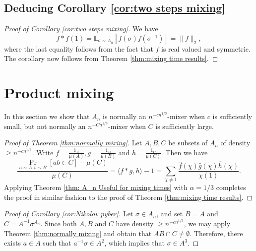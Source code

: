 \documentclass[11pt, letterpaper]{amsart}
\renewcommand\ge{\geqslant}
\begin{document}



\subsection{Deducing Corollary \ref{cor:two steps mixing}}

\begin{proof}[Proof of Corollary \ref{cor:two steps mixing}] We have \[f * f (1) =\mathbb{E}_{\sigma \sim A_n}[f(\sigma)f(\sigma^{-1})] = \|f\|_2,\]
where the last equality follows from the fact that $f$ is real valued and symmetric. The corollary now follows from Theorem \ref{thm:mixing time results}.    
\end{proof}


\section{Product mixing}
\label{sec:product mixing}
In this section we show that $A_n$ is normally an $n^{-cn^{1/3}}$-mixer when $c$ is sufficiently small, but not normally an $n^{-Cn^{1/3}}$-mixer when $C$ is sufficiently large.

\begin{proof}[Proof of Theorem \ref{thm:normally mixing}]
    Let $A,B,C$ be subsets of $A_n$ of density $\ge n^{-cn^{1/3}}$. Write $f=\frac{1_A}{\mu(A)},g=\frac{1_B}{\mu(B)}$ and $h=\frac{1_C}{\mu(C)}$. Then we have \[\frac{\Pr_{a\sim A,b\sim B}[ab\in C] -\mu(C)}{\mu(C)} = \langle f*g,h\rangle - 1= \sum_{\chi\ne 1} \frac{\hat{f}(\chi)\hat{g}(\chi)\hat{h}(\chi)}{\chi(1)}.\] Applying Theorem \ref{thm: A_n Useful for mixing times} with $\alpha = 1/3$ completes the proof in similar fashion to the proof of Theorem \ref{thm:mixing time results}.
\end{proof}


\begin{proof}[Proof of Corollary \ref{cor:Nikolov pyber}]
Let $\sigma \in A_n$, and set $B=A$ and $C = A^{-1}\sigma^{A_n}.$ Since both $A,B$ and $C$ have density $\ge n^{-cn^{1/3}}$, we may apply Theorem \ref{thm:normally mixing} and obtain that $A B \cap C \ne \emptyset$. Therefore, there exists $a \in A$ such that $a^{-1} \sigma \in A^2$, which implies that $\sigma \in A^3$.
\end{proof}
\end{document}
